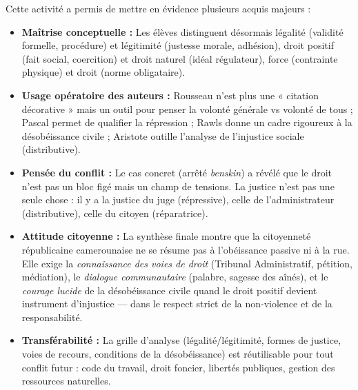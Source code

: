 \documentclass[11pt]{article}
\newcommand{\cle}[1]{{\popxbold\color{popdark}#1}}
\newcounter{popsec}
\newcounter{popsub}
\newcommand{\courssub}[1]{%
  \stepcounter{popsub}%
  \par\vspace{9pt}\noindent{\popxbold\fontsize{11.5}{13}\selectfont\color{popink}{\color{poporange}\thepopsec.\thepopsub}\hspace{6pt}#1}\par\nopagebreak\vspace{4pt}
}
\begin{document}
\courssub{Bilan de l'activité}
Cette activité a permis de mettre en évidence plusieurs acquis majeurs :
\begin{itemize}
    \item \textbf{Maîtrise conceptuelle :} Les élèves distinguent désormais \cle{légalité} (validité formelle, procédure) et \cle{légitimité} (justesse morale, adhésion), \cle{droit positif} (fait social, coercition) et \cle{droit naturel} (idéal régulateur), \cle{force} (contrainte physique) et \cle{droit} (norme obligataire).
    \item \textbf{Usage opératoire des auteurs :} Rousseau n'est plus une « citation décorative » mais un outil pour penser la volonté générale vs volonté de tous ; Pascal permet de qualifier la répression ; Rawls donne un cadre rigoureux à la désobéissance civile ; Aristote outille l'analyse de l'injustice sociale (distributive).
    \item \textbf{Pensée du conflit :} Le cas concret (arrêté \emph{benskin}) a révélé que le droit n'est pas un bloc figé mais un champ de tensions. La \cle{justice} n'est pas une seule chose : il y a la justice du juge (répressive), celle de l'administrateur (distributive), celle du citoyen (réparatrice).
    \item \textbf{Attitude citoyenne :} La synthèse finale montre que la citoyenneté républicaine camerounaise ne se résume pas à l'obéissance passive ni à la rue. Elle exige la \emph{connaissance des voies de droit} (Tribunal Administratif, pétition, médiation), le \emph{dialogue communautaire} (palabre, sagesse des aînés), et le \emph{courage lucide} de la désobéissance civile quand le droit positif devient instrument d'injustice — dans le respect strict de la non-violence et de la responsabilité.
    \item \textbf{Transférabilité :} La grille d'analyse (légalité/légitimité, formes de justice, voies de recours, conditions de la désobéissance) est réutilisable pour tout conflit futur : code du travail, droit foncier, libertés publiques, gestion des ressources naturelles.
\end{itemize}
\end{document}
